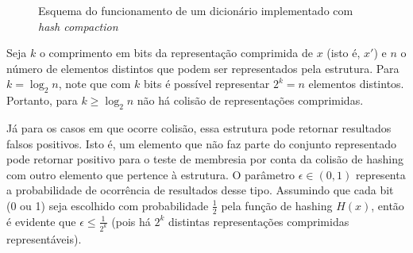 \documentclass[12pt,twoside,english,brazilian]{article}
\begin{document}
\begin{figure}
    \begin{center}
        \caption{\label{hash-compaction} Esquema do funcionamento de um dicionário implementado com \textit{hash compaction}}
    \end{center}
\end{figure}

Seja $k$ o comprimento em bits da representação comprimida de $x$ (isto é, $x'$) e $n$ o número de elementos distintos que podem ser representados pela estrutura. Para $k = \log_2{n}$, note que com $k$ bits é possível representar $2^k = n$ elementos distintos. Portanto, para $k \geq \log_2{n}$ não há colisão de representações comprimidas.

Já para os casos em que ocorre colisão, essa estrutura pode retornar resultados falsos positivos. Isto é, um elemento que não faz parte do conjunto representado pode retornar positivo para o teste de membresia por conta da colisão de hashing com outro elemento que pertence à estrutura. O parâmetro $\epsilon \in (0,1)$ representa a probabilidade de ocorrência de resultados desse tipo. Assumindo que cada bit (0 ou 1) seja escolhido com probabilidade $\frac{1}{2}$ pela função de hashing $H(x)$, então é evidente que $\epsilon \leq \frac{1}{2^k}$ (pois há $2^k$ distintas representações comprimidas representáveis).
\end{document}
